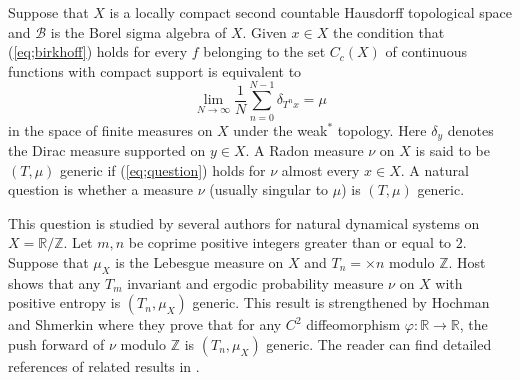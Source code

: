 \documentclass[12pt]{amsart}
\theoremstyle{definition}
\theoremstyle{remark}
\numberwithin{equation}{section}
\begin{document}
Suppose that   $X$ is a locally compact second countable  
 Hausdorff 
 topological space and $\mathcal B$ is the Borel sigma algebra
of $X$. 
Given $x\in X$ the condition 
 that   (\ref{eq;birkhoff}) holds for  every  $f$ belonging to   the set $C_c(X)$ of 
   continuous functions with compact support
is equivalent to 
\begin{equation}\label{eq;question}
\lim_{N\to \infty}\frac{1}{N} \sum_{n=0}^{N-1}\delta_{T^nx}=\mu
\end{equation}
in the space of finite measures on $X$ under the weak$^*$ topology. 
Here $\delta_y$ denotes the Dirac measure supported on $y\in X$.
A Radon measure $\nu$ on $X$ is said to be $(T,\mu)$ generic if   (\ref{eq;question}) holds
  for $\nu$ almost every $x\in X$. 
 A natural question is whether a measure $\nu$ (usually singular to $\mu$) is $(T,\mu)$ generic.
  
This question is studied by several authors for natural dynamical systems on $X=\mathbb R/\mathbb Z$. 
Let $m,n$ be coprime positive integers greater than or equal to $2$.
Suppose that     $\mu_X$ is the Lebesgue measure on $X$ and  $T_n=\times n $ modulo $\mathbb Z$.
Host \cite{h95} shows that
any  $T_m$ invariant and ergodic probability measure $\nu$ on
$X$ with positive entropy
  is  $(T_n, \mu_X)$ generic. This result  is strengthened by 
 Hochman and  Shmerkin \cite{hs} where they prove that for any $C^2$ diffeomorphism  $\varphi: \mathbb R\to \mathbb R$, the push forward of $\nu$ modulo $\mathbb Z$
is $(T_n, \mu_X)$ generic. The reader can find detailed references of related results in \cite{hs}.
\end{document}
